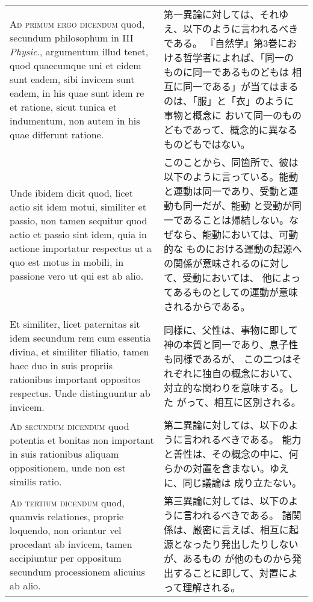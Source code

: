 \documentclass[10pt]{jsarticle} %
\begin{document}
\begin{longtable}{p{21em}p{21em}}
\\



{\scshape Ad primum ergo dicendum} quod, secundum philosophum in III {\itshape Physic}.,
argumentum illud tenet, quod quaecumque uni et eidem sunt eadem, sibi
invicem sunt eadem, in his quae sunt idem re et ratione, sicut tunica et
indumentum, non autem in his quae differunt ratione. 

&

第一異論に対しては、それゆえ、以下のように言われるべきである。
『自然学』第3巻における哲学者によれば、「同一のものに同一であるものどもは
 相互に同一である」が当てはまるのは、「服」と「衣」のように事物と概念に
 おいて同一のものどもであって、概念的に異なるものどもではない。


\\

Unde ibidem dicit
quod, licet actio sit idem motui, similiter et passio, non tamen
sequitur quod actio et passio sint idem, quia in actione importatur
respectus ut a quo est motus in mobili, in passione vero ut qui est ab
alio. 


&

このことから、同箇所で、彼は以下のように言っている。能動と運動は同一であり、受動と運動も同一だが、能動
 と受動が同一であることは帰結しない。なぜなら、能動においては、可動的な
 ものにおける運動の起源への関係が意味されるのに対して、受動においては、
 他によってあるものとしての運動が意味されるからである。


\\

Et similiter, licet paternitas sit idem secundum rem cum essentia
divina, et similiter filiatio, tamen haec duo in suis propriis
rationibus important oppositos respectus. Unde distinguuntur ab invicem.


&

同様に、父性は、事物に即して神の本質と同一であり、息子性も同様であるが、
 この二つはそれぞれに独自の概念において、対立的な関わりを意味する。した
 がって、相互に区別される。


\\



{\scshape Ad secundum dicendum} quod potentia et bonitas non important in suis
rationibus aliquam oppositionem, unde non est similis ratio.


&

第二異論に対しては、以下のように言われるべきである。
能力と善性は、その概念の中に、何らかの対置を含まない。ゆえに、同じ議論は
 成り立たない。

\\



{\scshape Ad tertium dicendum} quod, quamvis relationes, proprie loquendo, non
oriantur vel procedant ab invicem, tamen accipiuntur per oppositum
secundum processionem alicuius ab alio.


&

第三異論に対しては、以下のように言われるべきである。
諸関係は、厳密に言えば、相互に起源となったり発出したりしないが、あるもの
 が他のものから発出することに即して、対置によって理解される。

\end{longtable}
\end{document}

